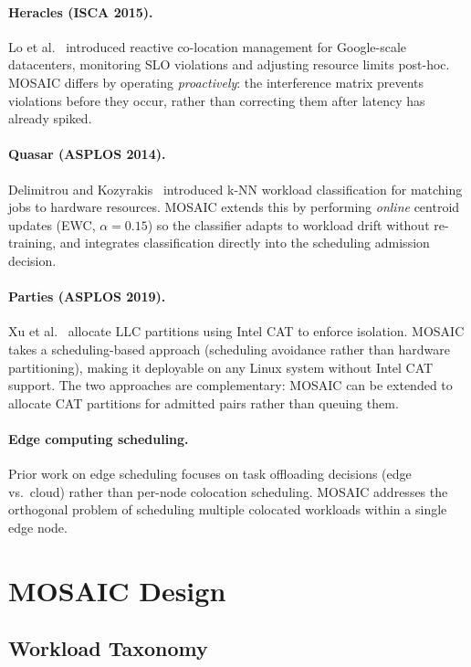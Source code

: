 \documentclass[sigconf,10pt]{acmart}
\newcommand{\sys}{MOSAIC\xspace}
\begin{document}
\paragraph{Heracles (ISCA 2015).}
Lo et al.~\cite{lo2015heracles} introduced reactive co-location management
for Google-scale datacenters, monitoring SLO violations and adjusting
resource limits post-hoc. \sys differs by operating \emph{proactively}:
the interference matrix prevents violations before they occur, rather than
correcting them after latency has already spiked.

\paragraph{Quasar (ASPLOS 2014).}
Delimitrou and Kozyrakis~\cite{delimitrou2014quasar} introduced
k-NN workload classification for matching jobs to hardware resources.
\sys extends this by performing \emph{online} centroid updates
(EWC, $\alpha=0.15$) so the classifier adapts to workload drift without
re-training, and integrates classification directly into the scheduling
admission decision.

\paragraph{Parties (ASPLOS 2019).}
Xu et al.~\cite{xu2019parties} allocate LLC partitions using Intel CAT to
enforce isolation. \sys takes a scheduling-based approach (scheduling
avoidance rather than hardware partitioning), making it deployable on any
Linux system without Intel CAT support. The two approaches are
complementary: \sys can be extended to allocate CAT partitions for
admitted pairs rather than queuing them.

\paragraph{Edge computing scheduling.}
Prior work on edge scheduling \cite{mao2017mec,hu2019dynamic} focuses on
task offloading decisions (edge vs.\ cloud) rather than per-node
colocation scheduling. \sys addresses the orthogonal problem of scheduling
multiple colocated workloads within a single edge node.

\section{\sys Design}

\subsection{Workload Taxonomy}
\end{document}
